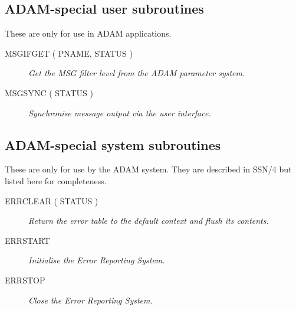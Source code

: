\documentclass[twoside,11pt]{article}
\newcommand{\htmlref}[2]{#1}
\newcommand{\xref}[3]{#1}
\newcommand{\xlabel}[1]{}
\renewcommand{\_}{\texttt{\symbol{95}}}
\newcommand{\listline}{\hspace{1pt}\\}
\renewcommand{\listline}{}
\begin{document}
\subsection{\xlabel{adam_special_user_subroutines}ADAM-special user subroutines}
These are only for use in ADAM applications.
\begin {description}
\item [\htmlref{MSG\_IFGET}{MSG_IFGET} ( PNAME, STATUS )] \listline 
\textit{ Get the MSG filter level from the ADAM parameter system.}
\item [\htmlref{MSG\_SYNC}{MSG_SYNC} ( STATUS )] \listline 
\textit{ Synchronise message output via the user interface.}
\end{description}

\subsection{\xlabel{adam_special_system_subroutines}ADAM-special system subroutines}
These are only for use by the ADAM system. They are described in
\xref{SSN/4}{ssn4}{routines_specific_to_the_adam_fixed_part}
but listed here for completeness.
\begin {description}
\item [\xref{ERR\_CLEAR}{ssn4}{ERR_CLEAR} ( STATUS )] \listline 
\textit{ Return the error table to the default context and flush its contents.}
\item [\xref{ERR\_START}{ssn4}{ERR_START}] \listline 
\textit{ Initialise the Error Reporting System.}
\item [\xref{ERR\_STOP}{ssn4}{ERR_STOP}] \listline 
\textit{ Close the Error Reporting System.}
\end{description}

\newpage
\end{document}
